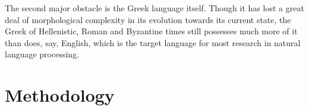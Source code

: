 The second major obstacle is the Greek language itself. Though it has
lost a great deal of morphological complexity in its evolution towards
its current state, the Greek of Hellenistic, Roman and Byzantine times
still possesses much more of it than does, say, English, which is the
target language for most research in natural language processing.

\section{Methodology}